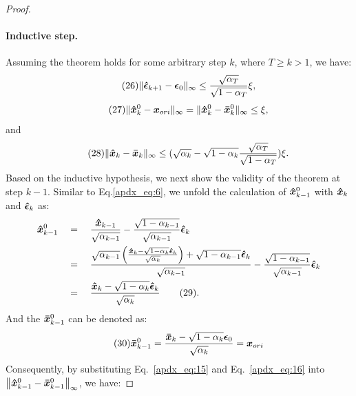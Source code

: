 \documentclass{article}
\newtheorem{proof}{Proof}
\begin{document}
\begin{proof}
\paragraph{Inductive step.} Assuming the theorem holds for some arbitrary step $k$, where $T \geq k > 1$, we have:
\begin{equation}\tag{26}
\|\boldsymbol{\Hat{\epsilon}}_{k+1} - \boldsymbol{\epsilon}_{0}\|_{\infty} \leq \frac{\sqrt{\alpha_T}}{\sqrt{1-\alpha_T}}\xi,
\label{apdx_eq:12}
\end{equation}
\begin{equation}\tag{27}
\|\boldsymbol{\Hat{x}}_{k}^{0} - \boldsymbol{x}_{ori}\|_{\infty} = \|\boldsymbol{\Hat{x}}_{k}^{0} - \boldsymbol{\Bar{x}}_{k}^{0}\|_{\infty} \leq\xi,
\label{apdx_eq:13}
\end{equation}
and
\begin{equation}\tag{28}
\|\boldsymbol{\Hat{x}}_{k} - \boldsymbol{\Bar{x}}_{k}\|_{\infty} \leq (\sqrt{\alpha_{k}} - \sqrt{1 - \alpha_{k}} \frac{\sqrt{\alpha_T}}{\sqrt{1-\alpha_T}})\xi.
\label{apdx_eq:14}
\end{equation}
Based on the inductive hypothesis, we next show the validity of the theorem at step $k-1$. Similar to Eq.\eqref{apdx_eq:6}, we unfold the calculation of $\boldsymbol{\Hat{x}}_{k-1}^{0}$ with $\boldsymbol{\Hat{x}}_{k}$ and $\boldsymbol{\Hat{\epsilon}}_{k}$ as:
\begin{alignat}{3}
& \boldsymbol{\Hat{x}}_{k-1}^{0} &&= \; && \frac{\boldsymbol{\Hat{x}}_{k-1}}{\sqrt{\alpha_{k-1}}} - \frac{\sqrt{1-\alpha_{k-1}}}{\sqrt{\alpha_{k-1}}}\boldsymbol{\Hat{\epsilon}}_{k} \notag \\
& &&= \; && \frac{\sqrt{\alpha_{k-1}}\left(\frac{\boldsymbol{\Hat{x}}_{k}-\sqrt{1-\alpha_{k}}\boldsymbol{\Hat{\epsilon}}_{k}}{\sqrt{\alpha_{k}}}\right) + \sqrt{1-\alpha_{k-1}}\boldsymbol{\Hat{\epsilon}}_{k}}{\sqrt{\alpha_{k-1}}} \notag  - \frac{\sqrt{1-\alpha_{k-1}}}{\sqrt{\alpha_{k-1}}}\boldsymbol{\Hat{\epsilon}}_{k} \notag \\
& &&= \; && \frac{\boldsymbol{\Hat{x}}_{k}-\sqrt{1-\alpha_{k}}\boldsymbol{\Hat{\epsilon}}_{k}}{\sqrt{\alpha_{k}}} \tag{29} \label{apdx_eq:15}.
\end{alignat}
And the $\boldsymbol{\Bar{x}}_{k-1}^0$ can be denoted as:
\begin{equation}\tag{30}
\boldsymbol{\Bar{x}}_{k-1}^{0} = \frac{\boldsymbol{\Bar{x}}_k-\sqrt{1-\alpha_k}\boldsymbol{{\epsilon}}_0}{\sqrt{\alpha_k}} = \boldsymbol{x}_{ori}
\label{apdx_eq:16}
\end{equation}
Consequently, by substituting Eq.~\eqref{apdx_eq:15} and Eq.~\eqref{apdx_eq:16} into $\left\|\boldsymbol{\Hat{x}}_{k-1}^{0} -  \boldsymbol{\Bar{x}}_{k-1}^{0}\right\|_\infty$, we have:

\end{proof}
\end{document}
